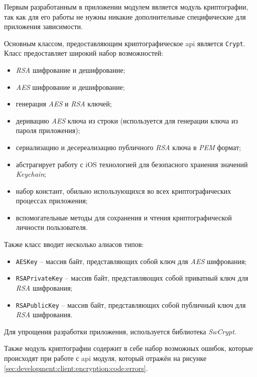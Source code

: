\subsubsection{}
\label{sec:development:client:encryption}

Первым разработанным в приложении модулем является модуль криптографии, так как для его работы не нужны никакие дополнительные специфические для приложения зависимости.

Основным классом, предоставляющим криптографическое \gls{api} является \texttt{Crypt}. Класс предоставляет широкий набор возможностей:

\begin{itemize}
	\item \textit{RSA} шифрование и дешифрование;
	\item \textit{AES} шифрование и дешифрование;
	\item генерация \textit{AES} и \textit{RSA} ключей;
	\item деривацию \textit{AES} ключа из строки (используется для генерации ключа из пароля приложения);
	\item сериализацию и десереализацию публичного \textit{RSA} ключа в \textit{PEM} формат;
	\item абстрагирует работу с iOS технологией для безопасного хранения значений \textit{Keychain};
	\item набор констант, обильно использующихся во всех криптографических процессах приложения;
	\item вспомогательные методы для сохранения и чтения криптографической личности пользователя.
\end{itemize}

Также класс вводит несколько алиасов типов:
\begin{itemize}
	\item \texttt{AESKey} -- массив байт, представляющих собой ключ для \textit{AES} шифрования;
	\item \texttt{RSAPrivateKey} -- массив байт, представляющих собой приватный ключ для \textit{RSA} шифрования;
	\item \texttt{RSAPublicKey} -- массив байт, представляющих собой публичный ключ для \textit{RSA} шифрования.
\end{itemize}

Для упрощения разработки приложения, используется библиотека \textit{SwCrypt}.

Также модуль криптографии содержит в себе набор возможных ошибок, которые происходят при работе с \gls{api} модуля, который отражён на рисунке \ref{sec:development:client:encryption:code:errors}.

